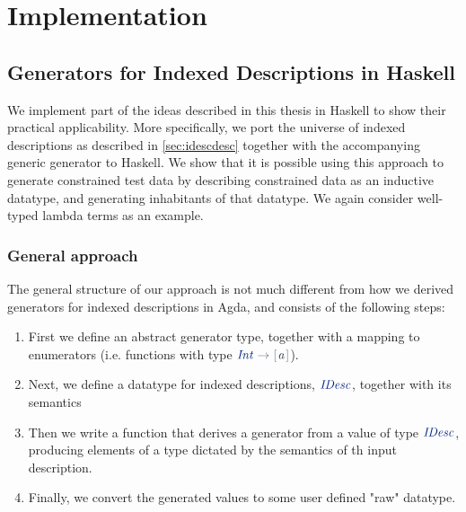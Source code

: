 \documentclass[a4paper,msc,twosized=semi]{uustthesis}
\newcommand*{\mathcolor}{}
\def\mathcolor#1#{\mathcoloraux{#1}}
\newcommand*{\mathcoloraux}[3]{%
  \protect\leavevmode
  \begingroup
    \color#1{#2}#3%
  \endgroup
}
\newcommand{\HSSpecial}[1]{\mathcolor{hsblue4}{#1}}
\newcommand{\HSSym}[1]{\mathcolor{hsblue4}{#1}}
\newcommand{\HSCon}[1]{\mathcolor{hsblue3}{\mathit{#1}}}
\newcommand{\HSVar}[1]{\mathcolor{hsblue5}{\mathit{#1}}}
\begin{document}

\part{Implementation}

\chapter{Generators for Indexed Descriptions in Haskell}
We implement part of the ideas described in this thesis in Haskell to show their 
practical applicability. More specifically, we port the universe of indexed 
descriptions as described in \cref{sec:idescdesc} together with the accompanying 
generic generator to Haskell. We show that it is possible using this approach to 
generate constrained test data by describing constrained data as an inductive datatype,
 and generating inhabitants of that datatype. We again consider well-typed lambda 
 terms as an example. 

\section{General approach}

  The general structure of our approach is not much different from how we derived 
  generators for indexed descriptions in Agda, and consists of the following steps: 

  \begin{enumerate}
    \item 
      First we define an abstract generator type, together with a mapping to 
      enumerators (i.e. functions with type \ensuremath{\HSCon{Int}\HSSym{\to} \HSSpecial{\HSSym{[\mskip1.5mu} }\HSVar{a}\HSSpecial{\HSSym{\mskip1.5mu]}}}). 

    \item 
      Next, we define a datatype for indexed descriptions, \ensuremath{\HSCon{IDesc}}, together with its 
      semantics

    \item 
      Then we write a function that derives a generator from a value of type \ensuremath{\HSCon{IDesc}}, 
      producing elements of a type dictated by the semantics of th input description. 

    \item 
      Finally, we convert the generated values to some user defined "raw" datatype.  
  \end{enumerate}
\end{document}
